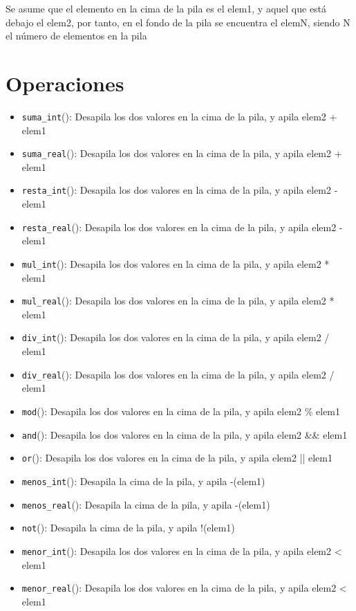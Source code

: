 Se asume que el elemento en la cima de la pila es el elem1, y aquel que está debajo el elem2, por tanto, en el fondo de la pila se encuentra el elemN, siendo N el número de elementos en la pila

\section{Operaciones}

\begin{itemize}
    \item \texttt{suma\_int}(): Desapila los dos valores en la cima de la pila, y apila elem2 + elem1
    \item \texttt{suma\_real}(): Desapila los dos valores en la cima de la pila, y apila elem2 + elem1
    \item \texttt{resta\_int}(): Desapila los dos valores en la cima de la pila, y apila elem2 - elem1
    \item \texttt{resta\_real}(): Desapila los dos valores en la cima de la pila, y apila elem2 - elem1
    \item \texttt{mul\_int}(): Desapila los dos valores en la cima de la pila, y apila elem2 * elem1
    \item \texttt{mul\_real}(): Desapila los dos valores en la cima de la pila, y apila elem2 * elem1
    \item \texttt{div\_int}(): Desapila los dos valores en la cima de la pila, y apila elem2 / elem1
    \item \texttt{div\_real}(): Desapila los dos valores en la cima de la pila, y apila elem2 / elem1
    \item \texttt{mod}(): Desapila los dos valores en la cima de la pila, y apila elem2 \% elem1
    \item \texttt{and}(): Desapila los dos valores en la cima de la pila, y apila elem2 \&\& elem1
    \item \texttt{or}(): Desapila los dos valores en la cima de la pila, y apila elem2 || elem1
    \item \texttt{menos\_int}(): Desapila la cima de la pila, y apila -(elem1)
    \item \texttt{menos\_real}(): Desapila la cima de la pila, y apila -(elem1)
    \item \texttt{not}(): Desapila la cima de la pila, y apila !(elem1)
    \item \texttt{menor\_int}(): Desapila los dos valores en la cima de la pila, y apila elem2 < \; elem1
    \item \texttt{menor\_real}(): Desapila los dos valores en la cima de la pila, y apila elem2 < \; elem1

\end{itemize}
